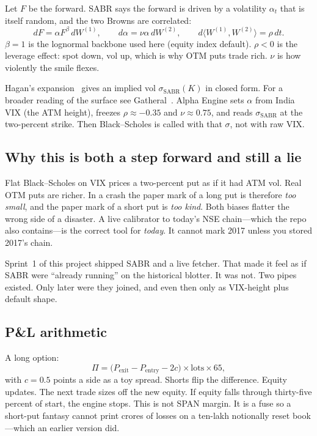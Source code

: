 \documentclass[11pt,a4paper]{article}
\begin{document}
Let $F$ be the forward. SABR says the forward is driven by a volatility $\alpha_t$ that is itself random, and the two Browns are correlated:
\begin{equation}
  dF=\alpha F^{\beta}\,dW^{(1)},\qquad
  d\alpha=\nu\alpha\,dW^{(2)},\qquad
  d\langle W^{(1)},W^{(2)}\rangle=\rho\,dt.
\end{equation}
$\beta=1$ is the lognormal backbone used here (equity index default). $\rho<0$ is the leverage effect: spot down, vol up, which is why OTM puts trade rich. $\nu$ is how violently the smile flexes.

Hagan's expansion~\cite{hagan2002} gives an implied vol $\sigma_{\mathrm{SABR}}(K)$ in closed form. For a broader reading of the surface see Gatheral~\cite{gatheral2006}. Alpha Engine sets $\alpha$ from India VIX (the ATM height), freezes $\rho\approx-0.35$ and $\nu\approx0.75$, and reads $\sigma_{\mathrm{SABR}}$ at the two-percent strike. Then Black--Scholes is called with that $\sigma$, not with raw VIX.

\subsection{Why this is both a step forward and still a lie}

Flat Black--Scholes on VIX prices a two-percent put as if it had ATM vol. Real OTM puts are richer. In a crash the paper mark of a long put is therefore \emph{too small}, and the paper mark of a short put is \emph{too kind}. Both biases flatter the wrong side of a disaster. A live calibrator to today's NSE chain---which the repo also contains---is the correct tool for \emph{today}. It cannot mark 2017 unless you stored 2017's chain.

Sprint~1 of this project shipped SABR and a live fetcher. That made it feel as if SABR were ``already running'' on the historical blotter. It was not. Two pipes existed. Only later were they joined, and even then only as VIX-height plus default shape.

\subsection{P\&L arithmetic}

A long option:
\begin{equation}
  \Pi = \bigl(P_{\mathrm{exit}}-P_{\mathrm{entry}}-2c\bigr)\times\text{lots}\times 65,
\end{equation}
with $c=0.5$ points a side as a toy spread. Shorts flip the difference. Equity updates. The next trade sizes off the new equity. If equity falls through thirty-five percent of start, the engine stops. This is not SPAN margin. It is a fuse so a short-put fantasy cannot print crores of losses on a ten-lakh notionally reset book---which an earlier version did.
\end{document}
